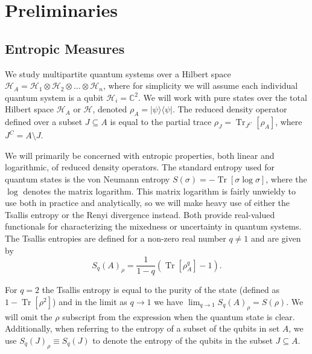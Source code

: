 \documentclass{article}
\DeclareMathOperator{\Tr}{Tr}
\newcommand{\ketbra}[2]{| #1\rangle\! \langle #2|}
\newcommand{\brackets}[1]{\left[ #1 \right]}
\newcommand{\set}[1]{\left\{ #1 \right\}}
\newcommand{\trace}[1]{\Tr \brackets{ #1 }}
\newcommand{\partrace}[2]{\Tr_{#1} \brackets{ #2 }}
\newcommand{\hilb}{\mathcal{H}}
\begin{document}
\section{Preliminaries}\label{sec:prelims}

\subsection{Entropic Measures}
\label{subsec:entropic_measures}

We study multipartite quantum systems over a Hilbert space $\hilb_A = \hilb_{1} \otimes \hilb_{2} \otimes \ldots \otimes \hilb_{n}$, where for simplicity we will assume each individual quantum system is a qubit $\hilb_{i} = \mathbb{C}^{2}$. We will work with pure states over the total Hilbert space $\hilb_A$ or $\hilb$, denoted $\rho_A = \ketbra{\psi}{\psi}$. The reduced density operator defined over a subset $J \subseteq A$ is equal to the partial trace $\rho_J = \partrace{J^C}{\rho_A}$, where $J^C = A \setminus J$. 


We will primarily be concerned with entropic properties, both linear and logarithmic, of reduced density operators. The standard entropy used for quantum states is the von Neumann entropy $S(\sigma) = - \trace{\sigma \log \sigma}$, where the $\log$ denotes the matrix logarithm. This matrix logarithm is fairly unwieldy to use both in practice and analytically, so we will make heavy use of either the Tsallis entropy or the Renyi divergence instead. Both provide real-valued functionals for characterizing the mixedness or uncertainty in quantum systems. The Tsallis entropies are defined for a non-zero real number $q \neq 1$ and are given by
\begin{equation}
\label{eq:tsallis_entropy}
    S_{q}(A)_{\rho} = \frac{1}{1 - q} (\trace{\rho_A^q} - 1).
\end{equation}

For $q=2$ the Tsallis entropy is equal to the purity of the state (defined as $1 - \trace{\rho^2}$) and in the limit as $q \to 1$ we have $\lim_{q \to 1} S_q(A)_{\rho} = S(\rho)$. We will omit the $\rho$ subscript from the expression when the quantum state is clear. Additionally, when referring to the entropy of a subset of the qubits in set $A$, we use $S_q(J)_{\rho} \equiv S_q(J)$ to denote the entropy of the qubits in the subset $J \subseteq A$.
\end{document}

